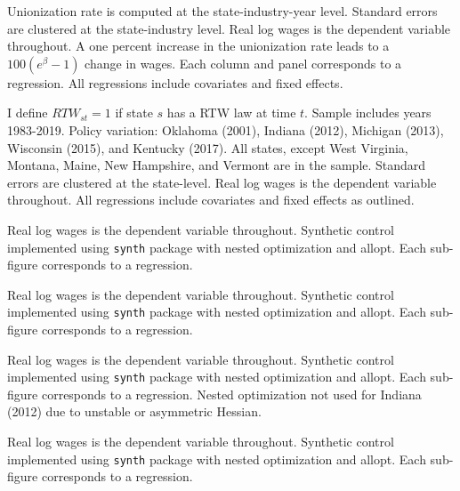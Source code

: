 \documentclass[11pt]{article}
\begin{document}
{\pagebreak
\small{}
\footnotesize{Unionization rate is computed at the state-industry-year level. Standard errors are clustered at the state-industry level. Real log wages is the dependent variable throughout. A one percent increase in the unionization rate leads to a $100(e^{\beta} - 1)$ change in wages. Each column and panel corresponds to a regression. All regressions include covariates and fixed effects.}

\pagebreak
\begin{landscape}
\small{}
\footnotesize{I define $RTW_{st} = 1$ if state $s$ has a RTW law at time $t$. Sample includes years 1983-2019. Policy variation: Oklahoma (2001), Indiana (2012), Michigan (2013), Wisconsin (2015), and Kentucky (2017). All states, except West Virginia, Montana, Maine, New Hampshire, and Vermont are in the sample. Standard errors are clustered at the state-level. Real log wages is the dependent variable throughout. All regressions include covariates and fixed effects as outlined.}
\end{landscape}

\pagebreak
\small{}
\footnotesize{Real log wages is the dependent variable throughout. Synthetic control implemented using \texttt{synth} package with nested optimization and allopt. Each sub-figure corresponds to a regression.}

\pagebreak
\small{}
\footnotesize{Real log wages is the dependent variable throughout. Synthetic control implemented using \texttt{synth} package with nested optimization and allopt. Each sub-figure corresponds to a regression.}

\pagebreak
\small{}
\footnotesize{Real log wages is the dependent variable throughout. Synthetic control implemented using \texttt{synth} package with nested optimization and allopt. Each sub-figure corresponds to a regression. Nested optimization not used for Indiana (2012) due to unstable or asymmetric Hessian.}

\pagebreak
\small{}
\footnotesize{Real log wages is the dependent variable throughout. Synthetic control implemented using \texttt{synth} package with nested optimization and allopt. Each sub-figure corresponds to a regression.}


}
\end{document}
